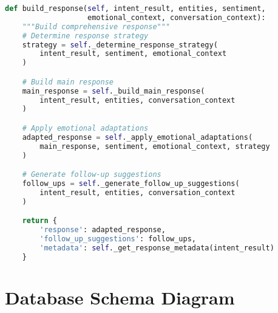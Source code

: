 \documentclass[12pt,a4paper]{article}
\begin{document}
\begin{lstlisting}[language=Python, caption=Contextual Response Generation]
def build_response(self, intent_result, entities, sentiment,
                   emotional_context, conversation_context):
    """Build comprehensive response"""
    # Determine response strategy
    strategy = self._determine_response_strategy(
        intent_result, sentiment, emotional_context
    )

    # Build main response
    main_response = self._build_main_response(
        intent_result, entities, conversation_context
    )

    # Apply emotional adaptations
    adapted_response = self._apply_emotional_adaptations(
        main_response, sentiment, emotional_context, strategy
    )

    # Generate follow-up suggestions
    follow_ups = self._generate_follow_up_suggestions(
        intent_result, entities, conversation_context
    )

    return {
        'response': adapted_response,
        'follow_up_suggestions': follow_ups,
        'metadata': self._get_response_metadata(intent_result)
    }
\end{lstlisting}

\section{Database Schema Diagram}
\end{document}
